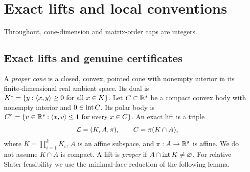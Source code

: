 \section{Exact lifts and local conventions}\label{sec:foundations}
Throughout, cone-dimension and matrix-order caps are integers.

\subsection{Exact lifts and genuine certificates}
A \emph{proper cone} is a closed, convex, pointed cone with nonempty
interior in its finite-dimensional real ambient space. Its dual is
$K^*=\{y:\langle x,y\rangle\geq0\text{ for all }x\in K\}$.
Let $C\subset\mathbb R^s$ be a compact convex body with nonempty interior and
$0\in\operatorname{int} C$. Its polar body is
$C^\circ=\{v\in\mathbb R^s:\langle x,v\rangle\leq1\text{ for every }x\in C\}$.
An exact lift is a triple
\[
 \mathcal L=(K,A,\pi),\qquad C=\pi(K\cap A),
\]
where $K=\prod_{i=1}^kK_i$, $A$ is an affine subspace, and
$\pi:A\to\mathbb R^s$ is affine. We do not assume $K\cap A$ is compact.
A lift is \emph{proper} if $A\cap\operatorname{int} K\ne\varnothing$.
For relative Slater feasibility we use the minimal-face reduction of the
following lemma.

